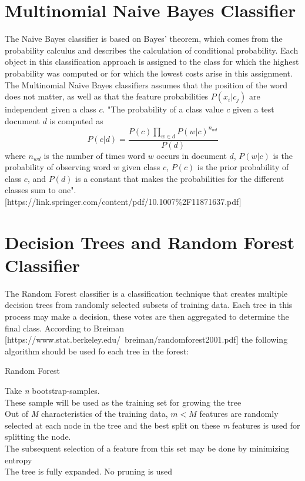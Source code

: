 \documentclass[a4paper, 11pt,titlepage,oneside,openany]{book}
\begin{document}
\section{Multinomial Naive Bayes Classifier}
The Naive Bayes classifier is based on  Bayes' theorem, which comes from the probability calculus and describes the calculation of conditional probability. Each object in this classification approach is assigned to the class for which the highest probability was computed or for which the lowest costs arise in this assignment.  \\
\noindent The Multinomial Naive Bayes classifiers assumes that the position of the word does not matter, as well as  that the feature probabilities $P(x_i|c_j)$ are independent given a class $c$.
"The probability of a class value $c$ given a test document $d$ is computed as
\[
P(c|d)=\frac{P(c)\prod \limits_{w \in d}P(w|c)^{n_{wd}} }{P(d)}
\]
where $n_{wd}$ is the number of times word $w$ occurs in document $d$, $P(w|c)$ is the probability of observing word $w$ given class $c$, $P(c)$ is the prior probability of class $c$, and $P(d)$ is a constant that makes the probabilities for the different classes sum to one". [https://link.springer.com/content/pdf/10.1007\%2F11871637.pdf]
\section{Decision Trees and Random Forest Classifier}


The Random Forest classifier is a classification technique that creates multiple decision trees from randomly selected subsets of training data. Each tree in this process may make a decision, these  votes are then aggregated to determine the final class. According to Breiman [https://www.stat.berkeley.edu/~breiman/randomforest2001.pdf] the following algorithm should be used fo each tree in the forest: 
\begin{algorithm}
	\caption{Random Forest}
	\label{save}
	\begin{algorithmic}[1]
		\STATE Take \textit{n} bootstrap-samples. \\
		\noindent These sample will be used as the training set for growing the tree \\
		\STATE Out of \textit{M} characteristics of the training data, $m<M$ features are randomly selected at each node in the tree and the best split on these \textit{m} features is used for splitting the node. \\
		\noindent The subsequent selection of a feature from this set may be done by minimizing entropy  \\
		\STATE The tree is fully expanded. No pruning is used \\
	\end{algorithmic}
\end{algorithm}
\end{document}
